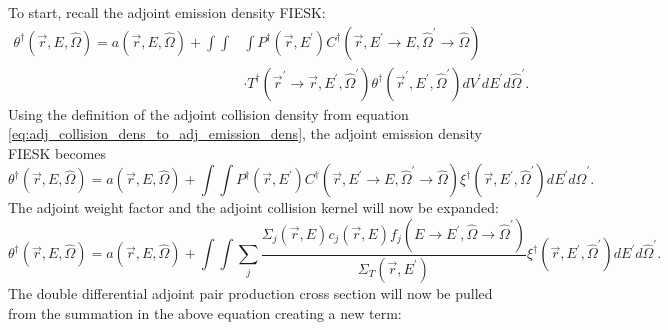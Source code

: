To start, recall the adjoint emission density FIESK:
\begin{equation*}
  \begin{split}
    \theta^{\dagger}(\vec{r},E,\hat{\Omega}) = a(\vec{r},E,\hat{\Omega}) + 
    \int\int&\int P^{\dagger}(\vec{r},E^{'})
    C^{\dagger}(\vec{r},E^{'} \to E,\hat{\Omega}^{'} \to \hat{\Omega}) \\
    & \cdot T^{\dagger}(\vec{r}^{'} \to \vec{r},E^{'},\hat{\Omega}^{'})
    \theta^{\dagger}(\vec{r}^{'},E^{'},\hat{\Omega}^{'})
    dV^{'} dE^{'} d\hat{\Omega}^{'}.
  \end{split}
\end{equation*}
Using the definition of the adjoint collision density from equation 
\ref{eq:adj_collision_dens_to_adj_emission_dens}, the adjoint emission density
FIESK becomes
\begin{equation*}
    \theta^{\dagger}(\vec{r},E,\hat{\Omega}) = a(\vec{r},E,\hat{\Omega}) + 
    \int\int P^{\dagger}(\vec{r},E^{'})
    C^{\dagger}(\vec{r},E^{'} \to E,\hat{\Omega}^{'} \to \hat{\Omega})
    \xi^{\dagger}(\vec{r},E^{'},\hat{\Omega}^{'}) dE^{'} d\hat{\Omega}^{'}.
\end{equation*}
The adjoint weight factor and the adjoint collision kernel will now be expanded:
\begin{equation*}
    \theta^{\dagger}(\vec{r},E,\hat{\Omega}) = a(\vec{r},E,\hat{\Omega}) + 
    \int\int \sum_j \frac{\Sigma_j(\vec{r},E)c_j(\vec{r},E)
      f_j(E \to E^{'},\hat{\Omega} \to \hat{\Omega}^{'})}{\Sigma_T(\vec{r},E^{'})}
    \xi^{\dagger}(\vec{r},E^{'},\hat{\Omega}^{'}) dE^{'} d\hat{\Omega}^{'}.
\end{equation*}
The double differential adjoint pair production cross section will now be
pulled from the summation in the above equation creating a new term:
